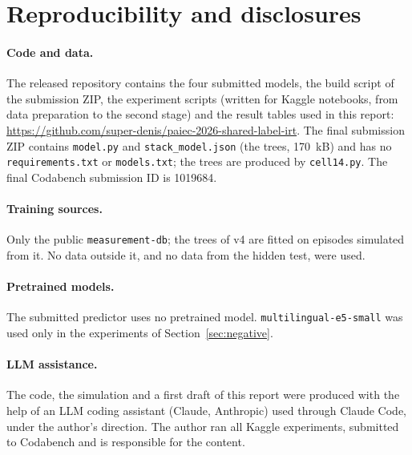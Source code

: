 \documentclass{article}
\begin{document}
\section{Reproducibility and disclosures}
\label{sec:repro}
\paragraph{Code and data.} The released repository contains the four submitted models, the build script of the submission ZIP, the experiment scripts (written for Kaggle notebooks, from data preparation to the second stage) and the result tables used in this report: \url{https://github.com/super-denis/paiec-2026-shared-label-irt}. The final submission ZIP contains \texttt{model.py} and \texttt{stack\_model.json} (the trees, 170~kB) and has no \texttt{requirements.txt} or \texttt{models.txt}; the trees are produced by \texttt{cell14.py}. The final Codabench submission ID is 1019684.

\paragraph{Training sources.} Only the public \texttt{measurement-db}; the trees of v4 are fitted on episodes simulated from it. No data outside it, and no data from the hidden test, were used.

\paragraph{Pretrained models.} The submitted predictor uses no pretrained model. \texttt{multilingual-e5-small} was used only in the experiments of Section~\ref{sec:negative}.

\paragraph{LLM assistance.} The code, the simulation and a first draft of this report were produced with the help of an LLM coding assistant (Claude, Anthropic) used through Claude Code, under the author's direction. The author ran all Kaggle experiments, submitted to Codabench and is responsible for the content.
\end{document}

